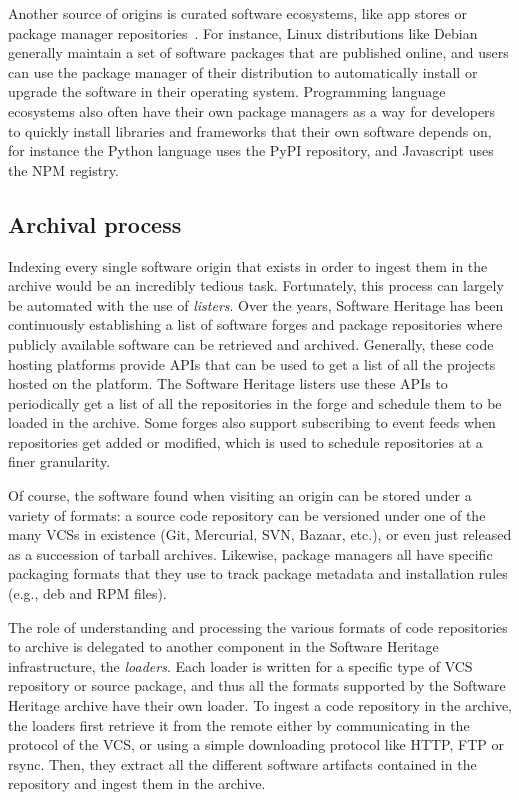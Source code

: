 Another source of origins is curated software ecosystems, like app stores or
package manager repositories~\cite{DBLP:conf/msr/KikasGDP17,
DBLP:conf/msr/AbateCGFTZ15}. For instance, Linux distributions like Debian
generally maintain a set of software packages that are published online, and
users can use the package manager of their distribution to automatically
install or upgrade the software in their operating system. Programming language
ecosystems also often have their own package managers as a way for developers
to quickly install libraries and frameworks that their own software depends on,
for instance the Python language uses the PyPI repository, and Javascript uses
the NPM registry.

\subsection{Archival process}

Indexing every single software origin that exists in order to ingest them in
the archive would be an incredibly tedious task. Fortunately, this process can
largely be automated with the use of \emph{listers}. Over the years, Software
Heritage has been continuously establishing a list of software forges and
package repositories where publicly available software can be retrieved and
archived. Generally, these code hosting platforms provide APIs that can be used
to get a list of all the projects hosted on the platform. The Software Heritage
listers use these APIs to periodically get a list of all the repositories in
the forge and schedule them to be loaded in the archive. Some forges also
support subscribing to event feeds when repositories get added or modified,
which is used to schedule repositories at a finer granularity.

Of course, the software found when visiting an origin can be stored under a
variety of formats: a source code repository can be versioned under one of the
many \glspl{VCS} in existence (Git, Mercurial, SVN, Bazaar, etc.), or even just
released as a succession of tarball archives. Likewise, package managers all
have specific packaging formats that they use to track package metadata and
installation rules (e.g., deb and RPM files).

The role of understanding and processing the various formats of code
repositories to archive is delegated to another component in the Software
Heritage infrastructure, the \emph{loaders}. Each loader is written for a
specific type of \gls{VCS} repository or source package, and thus all the
formats supported by the Software Heritage archive have their own loader. To
ingest a code repository in the archive, the loaders first retrieve it from the
remote either by communicating in the protocol of the VCS, or using a simple
downloading protocol like HTTP, FTP or rsync. Then, they extract all the
different software artifacts contained in the repository and ingest them in the
archive.

